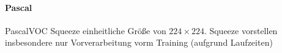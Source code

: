 \paragraph{\gls{Pascal}}

\begin{table}[t]
\centering
{}
\caption[Testgenauigkeiten der \gls{Pascal} Superpixelrepräsentationen]{50k Steps}
\label{tab:train_pascal}
\end{table}

PascalVOC Squeeze einheitliche Größe von $224 \times 224$.
Squeeze vorstellen
insbesondere nur Vorverarbeitung vorm Training (aufgrund Laufzeiten)
